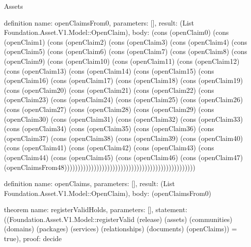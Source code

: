 \begin{lexlean}{Assets}
\begin{semanticmodule}
definition{
  name: openClaimsFrom0,
  parameters: [],
  result: (List Foundation.Asset.V1.Model::OpenClaim),
  body: (cons (openClaim0) (cons (openClaim1) (cons (openClaim2) (cons (openClaim3) (cons (openClaim4) (cons (openClaim5) (cons (openClaim6) (cons (openClaim7) (cons (openClaim8) (cons (openClaim9) (cons (openClaim10) (cons (openClaim11) (cons (openClaim12) (cons (openClaim13) (cons (openClaim14) (cons (openClaim15) (cons (openClaim16) (cons (openClaim17) (cons (openClaim18) (cons (openClaim19) (cons (openClaim20) (cons (openClaim21) (cons (openClaim22) (cons (openClaim23) (cons (openClaim24) (cons (openClaim25) (cons (openClaim26) (cons (openClaim27) (cons (openClaim28) (cons (openClaim29) (cons (openClaim30) (cons (openClaim31) (cons (openClaim32) (cons (openClaim33) (cons (openClaim34) (cons (openClaim35) (cons (openClaim36) (cons (openClaim37) (cons (openClaim38) (cons (openClaim39) (cons (openClaim40) (cons (openClaim41) (cons (openClaim42) (cons (openClaim43) (cons (openClaim44) (cons (openClaim45) (cons (openClaim46) (cons (openClaim47) (openClaimsFrom48)))))))))))))))))))))))))))))))))))))))))))))))))
}

definition{
  name: openClaims,
  parameters: [],
  result: (List Foundation.Asset.V1.Model::OpenClaim),
  body: (openClaimsFrom0)
}

theorem{
  name: registerValidHolds,
  parameters: [],
  statement: ((Foundation.Asset.V1.Model::registerValid (release) (assets) (communities) (domains) (packages) (services) (relationships) (documents) (openClaims)) = true),
  proof: decide{}
}
\end{semanticmodule}
\end{lexlean}
